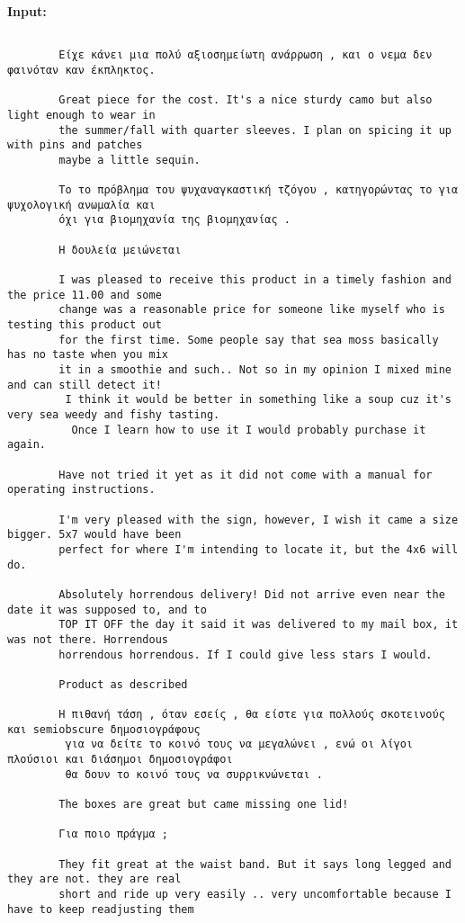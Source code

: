 \documentclass[11pt, a4paper]{article}
\begin{document}
	\textbf{Input:}
	\begin{verbatim}
		
		Είχε κάνει μια πολύ αξιοσημείωτη ανάρρωση , και ο νεμα δεν φαινόταν καν έκπληκτος.
		
		Great piece for the cost. It's a nice sturdy camo but also light enough to wear in 
		the summer/fall with quarter sleeves. I plan on spicing it up with pins and patches 
		maybe a little sequin.
		
		Το το πρόβλημα του ψυχαναγκαστική τζόγου , κατηγορώντας το για ψυχολογική ανωμαλία και 
		όχι για βιομηχανία της βιομηχανίας .
		
		Η δουλεία μειώνεται
		
		I was pleased to receive this product in a timely fashion and the price 11.00 and some 
		change was a reasonable price for someone like myself who is testing this product out 
		for the first time. Some people say that sea moss basically has no taste when you mix 
		it in a smoothie and such.. Not so in my opinion I mixed mine and can still detect it!
		 I think it would be better in something like a soup cuz it's very sea weedy and fishy tasting.
		  Once I learn how to use it I would probably purchase it again.
		
		Have not tried it yet as it did not come with a manual for operating instructions.
		
		I'm very pleased with the sign, however, I wish it came a size bigger. 5x7 would have been 
		perfect for where I'm intending to locate it, but the 4x6 will do.
		
		Absolutely horrendous delivery! Did not arrive even near the date it was supposed to, and to 
		TOP IT OFF the day it said it was delivered to my mail box, it was not there. Horrendous 
		horrendous horrendous. If I could give less stars I would.
		
		Product as described
		
		Η πιθανή τάση , όταν εσείς , θα είστε για πολλούς σκοτεινούς και semiobscure δημοσιογράφους
		 για να δείτε το κοινό τους να μεγαλώνει , ενώ οι λίγοι πλούσιοι και διάσημοι δημοσιογράφοι 
		 θα δουν το κοινό τους να συρρικνώνεται .
		
		The boxes are great but came missing one lid!
		
		Για ποιο πράγμα ;
		
		They fit great at the waist band. But it says long legged and they are not. they are real
		short and ride up very easily .. very uncomfortable because I have to keep readjusting them
		

\end{verbatim}
\end{document}
